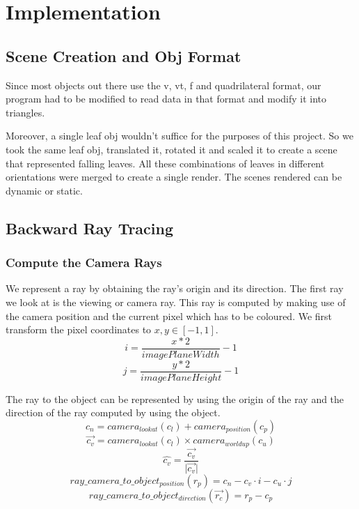 \documentclass[paper=a4, fontsize=11pt]{scrartcl}
\numberwithin{equation}{section}		%
\numberwithin{figure}{section}			%
\numberwithin{table}{section}				%
\begin{document}
\newpage
\section{Implementation}
\subsection{Scene Creation and Obj Format}
Since most objects out there use the v, vt, f and quadrilateral format, our program had to be modified to read data in that format and modify it into triangles.
\par
Moreover, a single leaf obj wouldn't suffice for the purposes of this project. So we took the same leaf obj, translated it, rotated it and scaled it to create a scene that represented falling leaves. All these combinations of leaves in different orientations were merged to create a single render. The scenes rendered can be dynamic or static.

\subsection{Backward Ray Tracing}
\subsubsection{Compute the Camera Rays}
We represent a ray by obtaining the ray's origin and its direction. The first ray we look at is the viewing or camera ray. This ray is computed by making use of the camera position and the current pixel which has to be coloured. We first transform the pixel coordinates to $x, y \in [-1, 1]$.
\[ i = \dfrac{x * 2}{imagePlaneWidth} - 1 \]
\[ j = \dfrac{y * 2}{imagePlaneHeight} - 1 \]

The ray to the object can be represented by using the origin of the ray and the direction of the ray computed by using the object.
\[c_{n} = camera_{lookat}(c_{l}) + camera_{position}(c_{p}) \]
\[\overrightarrow{c_{v}} = camera_{lookat}(c_{l}) \times camera_{worldup}(c_{u}) \]
\[\hat{c_{v}} = \dfrac{\overrightarrow{c_{v}}}{\lvert \overrightarrow{c_{v}} \rvert} \]
\[ray\_camera\_to\_object_{position} (r_{p}) = c_{n} - c_{v} \cdot i - c_{u} \cdot j\]
\[ray\_camera\_to\_object_{direction} (\overrightarrow{r_{c}}) = r_{p} - c_{p} \]
\end{document}
